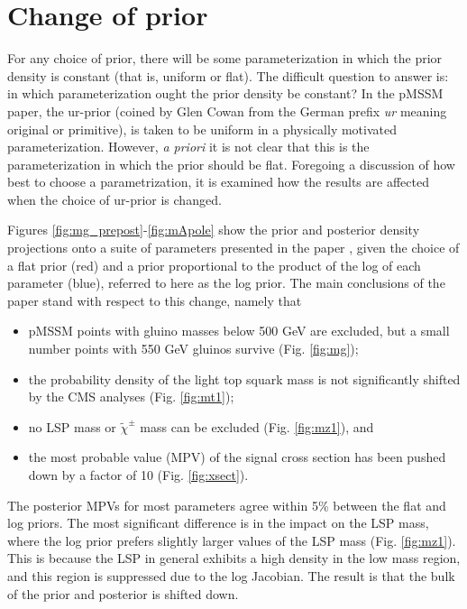 \section{Change of prior}
For any choice of prior, there will be some parameterization in which the prior density is constant (that is, uniform or flat). The difficult question to answer is: in which parameterization ought the prior density be constant? In the pMSSM paper, the ur-prior (coined by Glen Cowan from the German prefix {\it ur} meaning original or primitive), is taken to be uniform in a physically motivated parameterization. However, \emph{a priori} it is not clear that this
is the parameterization in which the prior should be flat.  
Foregoing a discussion of how best to choose a parametrization,  it is examined how the results are affected when the choice of ur-prior is changed.

Figures \ref{fig:mg_prepost}-\ref{fig:mApole} show the prior and posterior density projections onto a suite of parameters presented in the paper \cite{pMSSMpaper}, given the choice of a flat prior (red) and a prior proportional to the product of the log of each parameter (blue), referred to here as the log prior. The main conclusions of the paper stand with respect to this change, namely that
\begin{itemize}
\item pMSSM points with gluino masses below 500 GeV are excluded, but a small number points with 550 GeV gluinos survive (Fig. \ref{fig:mg});
\item the probability density of the light top squark mass is not significantly shifted by the CMS analyses (Fig. \ref{fig:mt1});
\item no LSP mass or $\tilde{\chi}^{\pm}$ mass can be excluded (Fig. \ref{fig:mz1}), and
\item the most probable value (MPV) of the signal cross section has been pushed down by a factor of 10 (Fig. \ref{fig:xsect}).
\end{itemize}
The posterior MPVs for most parameters agree within 5\% between the flat and log priors. The most significant difference is in the impact on the LSP mass, where the log prior prefers slightly larger values of the LSP mass (Fig. \ref{fig:mz1}). This is because the LSP in general exhibits a high density in the low mass region, and this region is suppressed due to the log Jacobian.  The result is that the bulk of the prior and posterior is shifted down.


